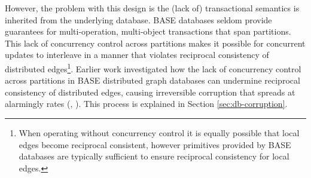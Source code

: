 \documentclass[sigplan,10pt]{acmart}
\begin{document}
However, the problem with this design is the (lack of) transactional semantics is inherited from the underlying database. BASE databases seldom provide guarantees for multi-operation, multi-object transactions that span partitions. This lack of concurrency control across partitions makes it possible for concurrent updates to interleave in a manner that violates reciprocal consistency of distributed edges\footnote{When operating without concurrency control it is equally possible that local edges become reciprocal consistent, however primitives provided by BASE databases are typically sufficient to ensure reciprocal consistency for local edges.}. Earlier work investigated how the lack of concurrency control across partitions in BASE distributed graph databases can undermine reciprocal consistency of distributed edges, causing irreversible corruption that spreads at alarmingly rates (\cite{Ezhilchelvan2018}, \cite{Webber2019}). This process is explained in Section \ref{sec:db-corruption}.
\end{document}
